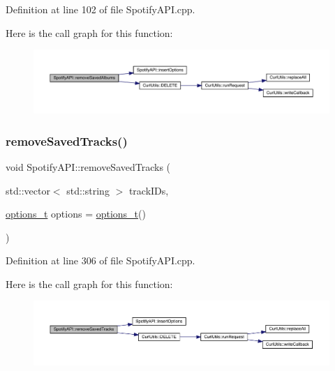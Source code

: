 Definition at line 102 of file Spotify\+A\+P\+I.\+cpp.

Here is the call graph for this function\+:
\nopagebreak
\begin{figure}[H]
\begin{center}
\leavevmode
\includegraphics[width=350pt]{class_spotify_a_p_i_ac17d1f6b822fcdf9c6ab6153ae8df6c3_cgraph}
\end{center}
\end{figure}
\mbox{\label{class_spotify_a_p_i_af844cb101057f17077fe1cfdd2d77c3b}} 
\subsubsection{\texorpdfstring{remove\+Saved\+Tracks()}{removeSavedTracks()}}
{\footnotesize\ttfamily void Spotify\+A\+P\+I\+::remove\+Saved\+Tracks (\begin{DoxyParamCaption}\item[{std\+::vector$<$ std\+::string $>$}]{track\+I\+Ds,  }\item[{\mbox{\hyperlink{_spotify_a_p_i_8h_a0ff5cac1a4007bb330b7d9939650c283}{options\+\_\+t}}}]{options = {\ttfamily \mbox{\hyperlink{_spotify_a_p_i_8h_a0ff5cac1a4007bb330b7d9939650c283}{options\+\_\+t}}()} }\end{DoxyParamCaption})}



Definition at line 306 of file Spotify\+A\+P\+I.\+cpp.

Here is the call graph for this function\+:
\nopagebreak
\begin{figure}[H]
\begin{center}
\leavevmode
\includegraphics[width=350pt]{class_spotify_a_p_i_af844cb101057f17077fe1cfdd2d77c3b_cgraph}
\end{center}
\end{figure}
\mbox{\label{class_spotify_a_p_i_ae1ce0b86c79df5f09a8d752dffd512ec}} 
